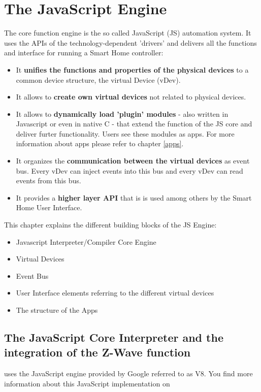 \chapter{The JavaScript Engine}
\label{cap:js}

The \zway  core function engine is the so called JavaScript (JS) automation system.
It uses the APIs of the technology-dependent 'drivers' and delivers all the functions
and interface for running a Smart Home controller:
\begin{itemize}
\item It \textbf{unifies the functions and properties of the physical devices} to a common 
device structure, the virtual Device (vDev).
\item It allows to \textbf{create own virtual devices} not related to physical devices.
\item It allows to \textbf{dynamically load 'plugin' modules}  - also written in Javascript or 
even in native C - that extend the function of the JS core and deliver furter functionality.
Users see these modules as apps. For more information about apps please refer to chapter 
\ref{apps}.
\item It organizes the \textbf{communication between the virtual devices} as event bus. Every 
vDev can inject events into this bus and every vDev can read events from this bus.
\item It provides a \textbf{higher layer API} that is 
is used among others by the Smart Home User Interface.
\end{itemize}

This chapter explains the different building blocks of the JS Engine:
\begin{itemize}
\item Javascript Interpreter/Compiler Core Engine
\item Virtual Devices
\item Event Bus
\item User Interface elements referring to the different virtual devices
\item The structure of the Apps
\end{itemize}

\section{The JavaScript Core Interpreter and the integration of the Z-Wave function}

\zway uses the JavaScript engine provided by Google referred to as V8. You find more 
information about this JavaScript implementation on 

